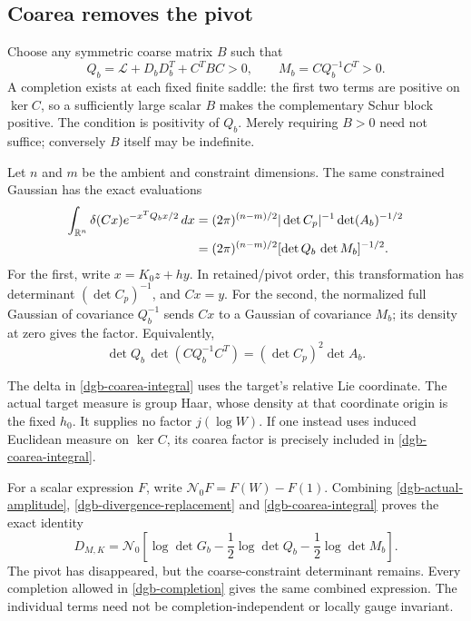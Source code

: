 \subsection{Coarea removes the pivot}
\label{dgb-coarea-section}

Choose any symmetric coarse matrix $B$ such that
\begin{equation}
 Q_b=\mathcal L+D_bD_b^T+C^TBC>0,\qquad
 M_b=CQ_b^{-1}C^T>0.
 \label{dgb-completion}
\end{equation}
A completion exists at each fixed finite saddle: the first
two terms are positive on $\ker C$, so a sufficiently large
scalar $B$ makes the complementary Schur block positive.
The condition is positivity of $Q_b$. Merely requiring
$B>0$ need not suffice; conversely $B$ itself may be indefinite.

Let $n$ and $m$ be the ambient and constraint dimensions.
The same constrained Gaussian has the exact evaluations
\begin{align}
 \int_{\mathbb R^n}\delta(Cx)e^{-x^TQ_bx/2}\,dx
  &=(2\pi)^{(n-m)/2}|\det C_p|^{-1}\det(A_b)^{-1/2}
       \notag\\
  &=(2\pi)^{(n-m)/2}
           [\det Q_b\,\det M_b]^{-1/2}.
 \label{dgb-coarea-integral}
\end{align}
For the first, write $x=K_0z+hy$. In retained/pivot order,
this transformation has determinant $(\det C_p)^{-1}$,
and $Cx=y$. For the second, the normalized full Gaussian
of covariance $Q_b^{-1}$ sends $Cx$ to a Gaussian of covariance
$M_b$; its density at zero gives the factor.
Equivalently,
\begin{equation}
 \det Q_b\,\det(CQ_b^{-1}C^T)
                         =(\det C_p)^2\det A_b .
 \label{dgb-coarea-determinant}
\end{equation}

The delta in \eqref{dgb-coarea-integral} uses the target's
relative Lie coordinate. The actual target measure is group
Haar, whose density at that coordinate origin is the fixed
$h_0$. It supplies no factor $j(\log W)$.
If one instead uses induced Euclidean measure on $\ker C$,
its coarea factor is precisely included in
\eqref{dgb-coarea-integral}.

For a scalar expression $F$, write
$\mathcal N_0F=F(W)-F(1)$. Combining
\eqref{dgb-actual-amplitude},
\eqref{dgb-divergence-replacement} and
\eqref{dgb-coarea-integral} proves the exact identity
\begin{equation}
 \boxed{\displaystyle
 D_{M,K}
   =\mathcal N_0\left[
       \log\det G_b-\frac12\log\det Q_b
                    -\frac12\log\det M_b\right].}
 \label{dgb-main-identity}
\end{equation}
The pivot has disappeared, but the coarse-constraint
determinant remains. Every completion allowed in
\eqref{dgb-completion} gives the same combined expression.
The individual terms need not be completion-independent
or locally gauge invariant.

